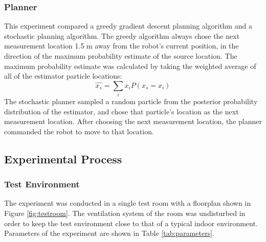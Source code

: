 \documentclass[submit, 12pt]{aiaa-pretty-modified}
\newcommand{\Tablewidthtwo}[0]{3in}
\begin{document}
\subsubsection{Planner}
This experiment compared a greedy gradient
descent planning algorithm and
a stochastic planning algorithm. The greedy algorithm always chose the
next measurement location 1.5 m away from the robot's current
position, in the direction of the maximum probability estimate of the source location. The
maximum probability estimate was calculated by taking the weighted average of
all of the estimator particle locations:
\[\hat{x_s} = \displaystyle\sum\limits_{i} x_i P(x_s = x_i) \]
The stochastic planner sampled a random particle from the posterior probability 
distribution of the estimator, and chose that particle's location as
the next measurement location.  After choosing the next measurement
location, the planner commanded the robot to move to that location.



\subsection{Experimental Process}
\subsubsection{Test Environment}

The experiment was conducted in a single test room with a floorplan
shown in Figure \ref{fig:testroom}. The ventilation system of the room was undisturbed in order to keep the test
environment close to that of a typical indoor environment. Parameters of the
experiment are shown in Table \ref{tab:parameters}.
\end{document}
